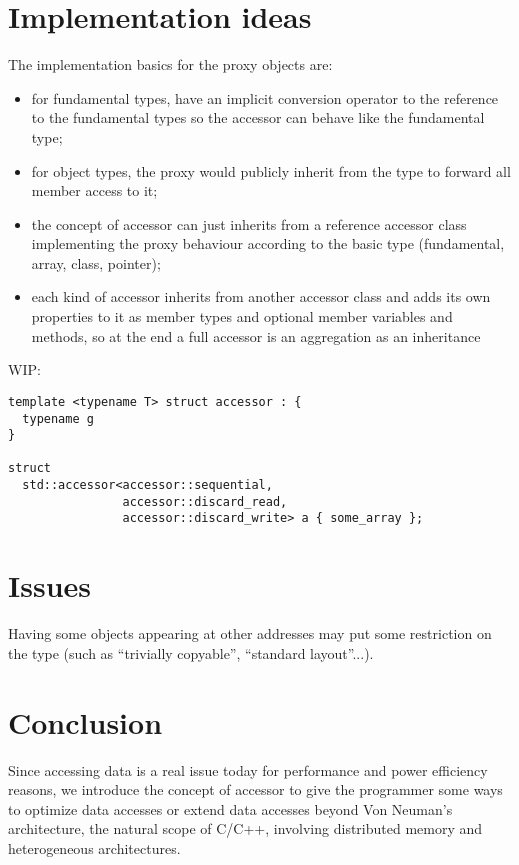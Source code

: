 \documentclass[a4paper]{article}
\begin{document}
\section{Implementation ideas}
\label{sec:implementation-ideas}

The implementation basics for the proxy objects are:
\begin{itemize}
\item for fundamental types, have an implicit conversion operator to
  the reference to the fundamental types so the accessor can behave
  like the fundamental type;
\item for object types, the proxy would publicly inherit from the type to
  forward all member access to it;
\item the concept of accessor can just inherits from a reference
  accessor class implementing the proxy behaviour according to the
  basic type (fundamental, array, class, pointer);
\item each kind of accessor inherits from another accessor class and
  adds its own properties to it as member types and optional member
  variables and methods, so at the end a full accessor is an
  aggregation as an inheritance 
\end{itemize}

WIP:
\begin{lstlisting}
template <typename T> struct accessor : {
  typename g
}

struct
  std::accessor<accessor::sequential,
                accessor::discard_read,
                accessor::discard_write> a { some_array };

\end{lstlisting}


\section{Issues}
\label{sec:issues}

Having some objects appearing at other addresses may put some
restriction on the type (such as ``trivially copyable'', ``standard
layout''...).


\section{Conclusion}
\label{sec:conclusion}

Since accessing data is a real issue today for performance and power
efficiency reasons, we introduce the concept of accessor to give the
programmer some ways to optimize data accesses or extend data accesses
beyond Von Neuman's architecture, the natural scope of C/C++,
involving distributed memory and heterogeneous architectures.
\end{document}

